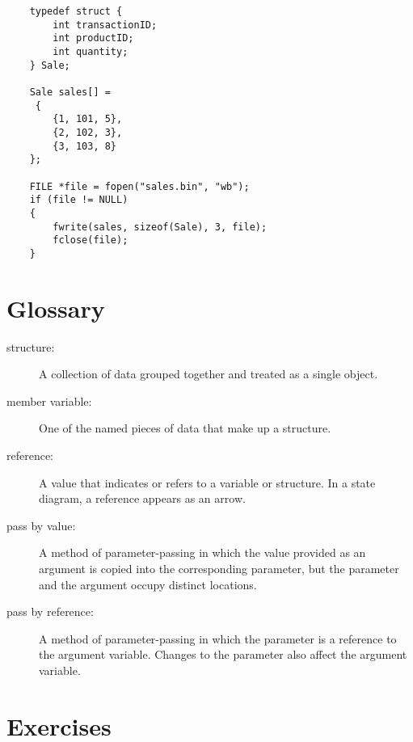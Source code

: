 \begin{verbatim}
	typedef struct {
		int transactionID;
		int productID;
		int quantity;
	} Sale;
	
	Sale sales[] =
	 {
		{1, 101, 5},
		{2, 102, 3},
		{3, 103, 8}
	};
	
	FILE *file = fopen("sales.bin", "wb");
	if (file != NULL) 
	{
		fwrite(sales, sizeof(Sale), 3, file);
		fclose(file);
	}
\end{verbatim}




\section{Glossary}

\begin{description}
	
	\item[structure:]  A collection of data grouped together and
	treated as a single object.
	
	\item[member variable:]  One of the named pieces of data that make up
	a structure.
	
	\item[reference:]  A value that indicates or refers to a variable
	or structure.  In a state diagram, a reference appears as an arrow.
	
	\item[pass by value:]  A method of parameter-passing in which the
	value provided as an argument is copied into the corresponding
	parameter, but the parameter and the argument occupy distinct
	locations.
	
	\item[pass by reference:]  A method of parameter-passing in which
	the parameter is a reference to the argument variable.  Changes
	to the parameter also affect the argument variable.
	
	
\end{description}

\section{Exercises}
\setcounter{exercisenum}{0}




